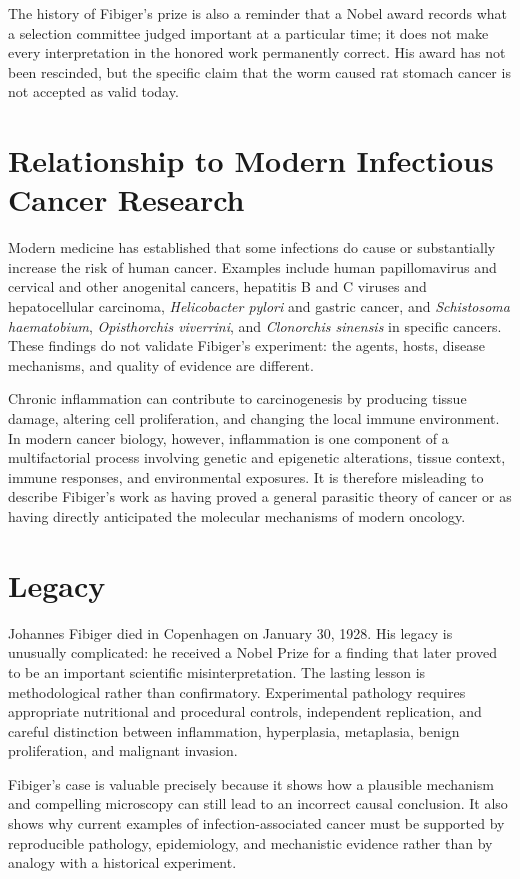 The history of Fibiger's prize is also a reminder that a Nobel award records what a selection committee judged important at a particular time; it does not make every interpretation in the honored work permanently correct. His award has not been rescinded, but the specific claim that the worm caused rat stomach cancer is not accepted as valid today.

\section{Relationship to Modern Infectious Cancer Research}

Modern medicine has established that some infections do cause or substantially increase the risk of human cancer. Examples include human papillomavirus and cervical and other anogenital cancers, hepatitis B and C viruses and hepatocellular carcinoma, \emph{Helicobacter pylori} and gastric cancer, and \emph{Schistosoma haematobium}, \emph{Opisthorchis viverrini}, and \emph{Clonorchis sinensis} in specific cancers. These findings do not validate Fibiger's experiment: the agents, hosts, disease mechanisms, and quality of evidence are different.

Chronic inflammation can contribute to carcinogenesis by producing tissue damage, altering cell proliferation, and changing the local immune environment. In modern cancer biology, however, inflammation is one component of a multifactorial process involving genetic and epigenetic alterations, tissue context, immune responses, and environmental exposures. It is therefore misleading to describe Fibiger's work as having proved a general parasitic theory of cancer or as having directly anticipated the molecular mechanisms of modern oncology.

\section{Legacy}

Johannes Fibiger died in Copenhagen on January 30, 1928. His legacy is unusually complicated: he received a Nobel Prize for a finding that later proved to be an important scientific misinterpretation. The lasting lesson is methodological rather than confirmatory. Experimental pathology requires appropriate nutritional and procedural controls, independent replication, and careful distinction between inflammation, hyperplasia, metaplasia, benign proliferation, and malignant invasion.

Fibiger's case is valuable precisely because it shows how a plausible mechanism and compelling microscopy can still lead to an incorrect causal conclusion. It also shows why current examples of infection-associated cancer must be supported by reproducible pathology, epidemiology, and mechanistic evidence rather than by analogy with a historical experiment.

